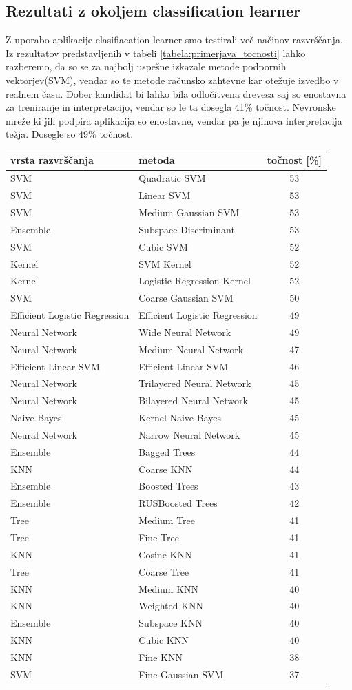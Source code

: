 \subsection{Rezultati z okoljem classification learner}
Z uporabo aplikacije clasifiacation learner smo testirali več načinov razvrščanja. Iz rezultatov predstavljenih v tabeli \ref{tabela:primerjava_tocnosti} lahko razberemo, da so se za najbolj uspešne izkazale metode podpornih vektorjev(SVM), vendar so te metode računsko zahtevne kar otežuje izvedbo v realnem času. Dober kandidat bi lahko bila odločitvena drevesa saj so enostavna za treniranje in interpretacijo, vendar so le ta dosegla 41\% točnost. Nevronske mreže ki jih podpira aplikacija so enostavne, vendar pa je njihova interpretacija težja. Dosegle so 49\% točnost.
\begin{table}
\centering
\begin{tabular}{|l|l|c|}
\hline
vrsta razvrščanja & metoda & točnost [\%] \\
\hline SVM&Quadratic SVM&53\\
\hline SVM&Linear SVM&53\\
\hline SVM&Medium Gaussian SVM&53\\
\hline Ensemble&Subspace Discriminant&53\\
\hline SVM&Cubic SVM&52\\
\hline Kernel&SVM Kernel&52\\
\hline Kernel&Logistic Regression Kernel&52\\
\hline SVM&Coarse Gaussian SVM&50\\
\hline Efficient Logistic Regression&Efficient Logistic Regression&49\\
\hline Neural Network&Wide Neural Network&49\\
\hline Neural Network&Medium Neural Network&47\\
\hline Efficient Linear SVM&Efficient Linear SVM&46\\
\hline Neural Network&Trilayered Neural Network&45\\
\hline Neural Network&Bilayered Neural Network&45\\
\hline Naive Bayes&Kernel Naive Bayes&45\\
\hline Neural Network&Narrow Neural Network&45\\
\hline Ensemble&Bagged Trees&44\\
\hline KNN&Coarse KNN&44\\
\hline Ensemble&Boosted Trees&43\\
\hline Ensemble&RUSBoosted Trees&42\\
\hline Tree&Medium Tree&41\\
\hline Tree&Fine Tree&41\\
\hline KNN&Cosine KNN&41\\
\hline Tree&Coarse Tree&41\\
\hline KNN&Medium KNN&40\\
\hline KNN&Weighted KNN&40\\
\hline Ensemble&Subspace KNN&40\\
\hline KNN&Cubic KNN&40\\
\hline KNN&Fine KNN&38\\
\hline SVM&Fine Gaussian SVM&37\\


\end{tabular}
\end{table}
